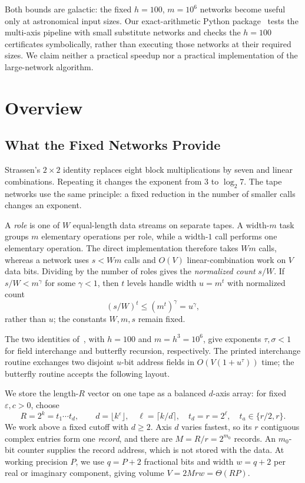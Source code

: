 \documentclass[11pt]{article}
\theoremstyle{definition}
\renewcommand{\label}[1]{}%
\newcommand{\eps}{\varepsilon}
\begin{document}
Both bounds are galactic: the fixed $h=100$, $m=10^6$ networks become useful only at astronomical input sizes.
Our exact-arithmetic Python package~\cite{Code26} tests the multi-axis pipeline with small substitute networks and checks the $h=100$ certificates symbolically, rather than executing those networks at their required sizes.
We claim neither a practical speedup nor a practical implementation of the large-network algorithm.

\begingroup
\setlength{\textfloatsep}{10pt plus 2pt minus 2pt}
\setlength{\intextsep}{7pt plus 2pt minus 2pt}
\captionsetup[figure]{skip=6pt}
\captionsetup[table]{skip=6pt}
\section{Overview}\label{sec:overview}

\subsection{What the Fixed Networks Provide}

Strassen's $2\times2$ identity replaces eight block multiplications by seven and linear combinations.
Repeating it changes the exponent from $3$ to $\log_2 7$.
The tape networks use the same principle: a fixed reduction in the number of smaller calls changes an exponent.

A \emph{role} is one of $W$ equal-length data streams on separate tapes.
A width-$m$ task groups $m$ elementary operations per role, while a width-$1$ call performs one elementary operation.
The direct implementation therefore takes $Wm$ calls, whereas a network uses $s<Wm$ calls and $O(V)$ linear-combination work on $V$ data bits.
Dividing by the number of roles gives the \emph{normalized count} $s/W$.
If $s/W<m^\gamma$ for some $\gamma<1$, then $t$ levels handle width $u=m^t$ with normalized count
\[
 (s/W)^t\le (m^t)^\gamma=u^\gamma,
\]
rather than $u$; the constants $W,m,s$ remain fixed.

The two identities of~\cite{OAI26}, with $h=100$ and $m=h^3=10^6$, give exponents $\tau,\sigma<1$ for field interchange and butterfly recursion, respectively.
The printed interchange routine exchanges two disjoint $u$-bit address fields in $O(V(1+u^\tau))$ time; the butterfly routine accepts the following layout.

We store the length-$R$ vector on one tape as a balanced $d$-axis array: for fixed $\eps,c>0$, choose
\[
 R=2^k=t_1\cdots t_d,\qquad
 d=\lfloor k^\eps\rfloor,\quad \ell=\lceil k/d\rceil,\quad
 t_d=r=2^\ell,\quad t_a\in\{r/2,r\}.
\]
We work above a fixed cutoff with $d\ge2$.
Axis $d$ varies fastest, so its $r$ contiguous complex entries form one \emph{record}, and there are $M=R/r=2^{m_0}$ records.
An $m_0$-bit counter supplies the record address, which is not stored with the data.
At working precision $P$, we use $q=P+2$ fractional bits and width $w=q+2$ per real or imaginary component, giving volume $V=2Mrw=\Theta(RP)$.
\end{document}
